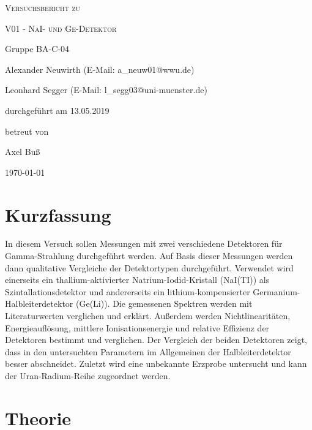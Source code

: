 \documentclass[
	a4paper,
	12pt,
	pagesize,
	ngerman
]{scrartcl}
\begin{document}
	\begin{titlepage}
		\centering
		{\scshape\LARGE Versuchsbericht zu \par}
		\vspace{1cm}
		{\scshape\huge V01 - NaI- und Ge-Detektor \par}
		\vspace{2.5cm}
		{\LARGE Gruppe BA-C-04 \par}
		\vspace{0.5cm}

		{\large Alexander Neuwirth (E-Mail: a\_neuw01@wwu.de) \par}
		{\large Leonhard Segger (E-Mail: l\_segg03@uni-muenster.de) \par}
		\vfill

		durchgeführt am 13.05.2019\par
		betreut von\par
		{\large Axel Buß}

		\vfill

		{\large \today\par}
	\end{titlepage}
	\tableofcontents
	\newpage

	\section{Kurzfassung}
	In diesem Versuch sollen Messungen mit zwei verschiedene Detektoren für Gamma-Strahlung durchgeführt werden.
	Auf Basis dieser Messungen werden dann qualitative Vergleiche der Detektortypen durchgeführt.
	Verwendet wird einerseits ein thallium-aktivierter Natrium-Iodid-Kristall (NaI(TI)) als Szintallationsdetektor und andererseits ein lithium-kompensierter Germanium-Halbleiterdetektor (Ge(Li)).
	Die gemessenen Spektren werden mit Literaturwerten verglichen und erklärt.
	Außerdem werden Nichtlinearitäten, Energieauflösung, mittlere Ionisationsenergie und relative Effizienz der Detektoren bestimmt und verglichen.
	Der Vergleich der beiden Detektoren zeigt, dass in den untersuchten Parametern im Allgemeinen der Halbleiterdetektor besser abschneidet.
	Zuletzt wird eine unbekannte Erzprobe untersucht und kann der Uran-Radium-Reihe zugeordnet werden.

  \section{Theorie}
\end{document}
